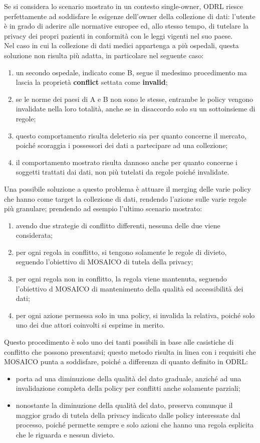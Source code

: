 \documentclass[12pt,a4paper,twoside]{book}
\begin{document}
Se si considera lo scenario mostrato in un contesto single-owner, ODRL riesce perfettamente ad soddisfare le esigenze dell'owner della collezione di dati: l'utente è in grado di aderire alle normative europee ed, allo stesso tempo, di tutelare la privacy dei propri pazienti in conformità con le leggi vigenti nel suo paese.\\
Nel caso in cui la collezione di dati medici appartenga a più ospedali, questa soluzione non risulta più adatta, in particolare nel seguente caso:
\begin{enumerate}
	\item un secondo ospedale, indicato come B, segue il medesimo procedimento ma lascia la proprietà \textbf{conflict} settata come \textbf{invalid};
	\item se le norme dei paesi di A e B non sono le stesse, entrambe le policy vengono invalidate nella loro totalità, anche se in disaccordo solo su un sottoinsieme di regole;
	\item questo comportamento risulta deleterio sia per quanto concerne il mercato, poiché scoraggia i possessori dei dati a partecipare ad una collezione; \item il comportamento mostrato risulta dannoso anche per quanto concerne i soggetti trattati dai dati, non più tutelati da regole poiché invalidate.
\end{enumerate}
Una possibile soluzione a questo problema è attuare il merging delle varie policy che hanno come target la collezione di dati, rendendo l'azione sulle varie regole più granulare; prendendo ad esempio l'ultimo scenario mostrato:
\begin{enumerate}
	\item avendo due strategie di conflitto differenti, nessuna delle due viene considerata;
	\item per ogni regola in conflitto, si tengono solamente le regole di divieto, seguendo l'obiettivo di MOSAICO di tutela della privacy;
	\item per ogni regola non in conflitto, la regola viene mantenuta, seguendo l'obiettivo d MOSAICO di mantenimento della qualità ed accessibilità dei dati;
	\item per ogni azione permessa solo in una policy, si invalida la relativa, poiché solo uno dei due attori coinvolti si esprime in merito.
\end{enumerate}
Questo procedimento è solo uno dei tanti possibili in base alle casistiche di conflitto che possono presentarsi; questo metodo risulta in linea con i requisiti che MOSAICO punta a soddisfare, poiché a differenza di quanto definito in ODRL:
\begin{itemize}
	\item porta ad una diminuzione della qualità del dato graduale, anziché ad una invalidazione completa della policy per conflitti anche solamente parziali;
	\item nonostante la diminuzione della qualità del dato, preserva comunque il maggior grado di tutela della privacy indicato dalle policy interessate dal processo, poiché permette sempre e solo azioni che hanno una regola esplicita che le riguarda e nessun divieto.
\end{itemize}
\end{document}
